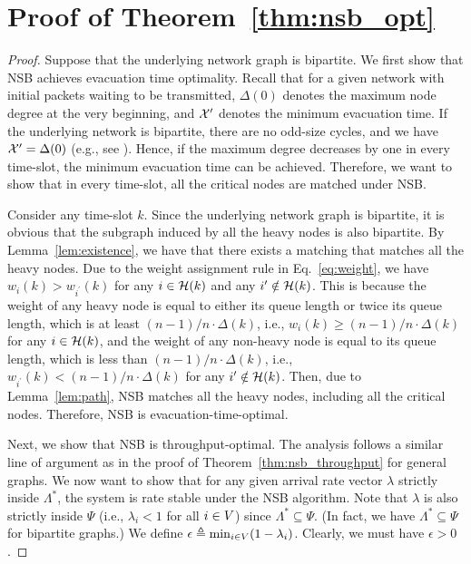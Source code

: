 \documentclass[10pt,journal,compsoc]{IEEEtran}
\begin{document}
\section{Proof of Theorem~\ref{thm:nsb_opt}} \label{sec:thm:nsb_opt}
\begin{proof}
Suppose that the underlying network graph is bipartite.
We first show that NSB achieves evacuation time optimality. Recall that for a given network 
with initial packets waiting to be transmitted, $\Delta(0)$ denotes the maximum node degree at the 
very beginning, and $\mathcal{X}^{\prime}$ denotes the minimum evacuation time. If the underlying network is bipartite, 
there are no odd-size cycles, and we have $\mathcal{X}^{\prime}=\Delta(0)$ (e.g., see \cite{konig16,kapoor00,guptathesis}). 
Hence, if the maximum degree decreases by one in every time-slot, the minimum evacuation time can be achieved. 
Therefore, we want to show that in every time-slot, all the critical nodes are matched under NSB.


Consider any time-slot $k$. Since the underlying network graph is bipartite, it is obvious that the subgraph
induced by all the heavy nodes is also bipartite. By Lemma~\ref{lem:existence}, we have that there exists 
a matching that matches all the heavy nodes. Due to the weight assignment rule in Eq.~\eqref{eq:weight},
we have $w_i(k) > w_{i^\prime}(k)$ for any $i \in \mathcal{H}(k)$ and any $i^{\prime} \notin \mathcal{H}(k)$. This is because
the weight of any heavy node is equal to either its queue length or twice its queue length, which is at least 
$(n-1)/n \cdot \Delta(k)$, i.e., $w_i(k) \ge (n-1)/n \cdot \Delta(k)$ for any $i \in \mathcal{H}(k)$, and the weight of 
any non-heavy node is equal to its queue length, which is less than $(n-1)/n \cdot \Delta(k)$, i.e., 
$w_{i^{\prime}}(k) < (n-1)/n \cdot \Delta(k)$ for any $i^{\prime} \notin \mathcal{H}(k)$. 
Then, due to Lemma~\ref{lem:path}, NSB matches all the heavy nodes, including all the critical nodes.
Therefore, NSB is evacuation-time-optimal.

Next, we show that NSB is throughput-optimal.
The analysis follows a similar line of argument as in the proof of Theorem~\ref{thm:nsb_throughput} 
for general graphs. We now want to show that for any given arrival rate vector $\lambda$ strictly inside 
$\Lambda^*$, the system is rate stable under the NSB algorithm. Note that $\lambda$ is also strictly 
inside $\Psi$ (i.e., $\lambda_i < 1$ for all $i \in V$) since $\Lambda^* \subseteq \Psi$.
(In fact, we have $\Lambda^* \subseteq \Psi$ for bipartite graphs.) 
We define $\epsilon \triangleq \min_{i \in V} (1-\lambda_i)$. Clearly, we must have $\epsilon > 0$. 


\end{proof}
\end{document}
